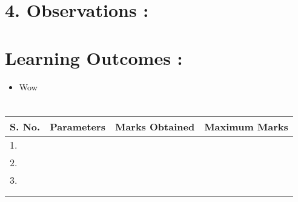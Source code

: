 \documentclass[14pt]{extarticle}
\begin{document}
\newpage
\section*{\normalsize 4. Observations :}


\newpage
\section*{\normalsize Learning Outcomes :}

  \begin{itemize}
    \item Wow
  \end{itemize}

\section*{}

\begin{center}

\begin{tabular}{ |p{2.5cm}|p{4cm}|p{5cm}|p{5cm}|}
 \hline
 S. No. & Parameters & Marks Obtained & Maximum Marks \\
 \hline
 1.&&&\\
 \hline
 2.&&&\\
 \hline
 3.&&&\\
 \hline
 &&&\\
 &&&\\
 \hline
\end{tabular}
\end{center}
\end{document}
